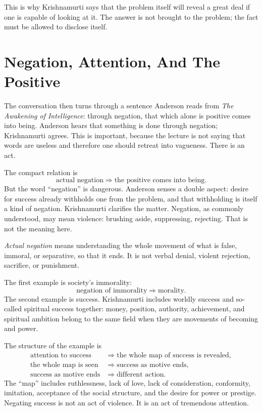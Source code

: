 This is why Krishnamurti says that the problem itself will reveal a great deal if one is capable of looking at it. The answer is not brought to the problem; the fact must be allowed to disclose itself.

\section{Negation, Attention, And The Positive}

The conversation then turns through a sentence Anderson reads from \emph{The Awakening of Intelligence}: through negation, that which alone is positive comes into being. Anderson hears that something is done through negation; Krishnamurti agrees. This is important, because the lecture is not saying that words are useless and therefore one should retreat into vagueness. There is an act.

The compact relation is
\begin{equation}
\text{actual negation}
\Longrightarrow
\text{the positive comes into being}.
\end{equation}
But the word ``negation'' is dangerous. Anderson senses a double aspect: desire for success already withholds one from the problem, and that withholding is itself a kind of negation. Krishnamurti clarifies the matter. Negation, as commonly understood, may mean violence: brushing aside, suppressing, rejecting. That is not the meaning here.

\begin{definition}
\emph{Actual negation} means understanding the whole movement of what is false, immoral, or separative, so that it ends. It is not verbal denial, violent rejection, sacrifice, or punishment.
\end{definition}

The first example is society's immorality:
\begin{equation}
\text{negation of immorality}
\Longrightarrow
\text{morality}.
\end{equation}
The second example is success. Krishnamurti includes worldly success and so-called spiritual success together: money, position, authority, achievement, and spiritual ambition belong to the same field when they are movements of becoming and power.

The structure of the example is
\begin{align}
\text{attention to success}
&\Longrightarrow
\text{the whole map of success is revealed},\\
\text{the whole map is seen}
&\Longrightarrow
\text{success as motive ends},\\
\text{success as motive ends}
&\Longrightarrow
\text{different action}.
\end{align}
The ``map'' includes ruthlessness, lack of love, lack of consideration, conformity, imitation, acceptance of the social structure, and the desire for power or prestige. Negating success is not an act of violence. It is an act of tremendous attention.

